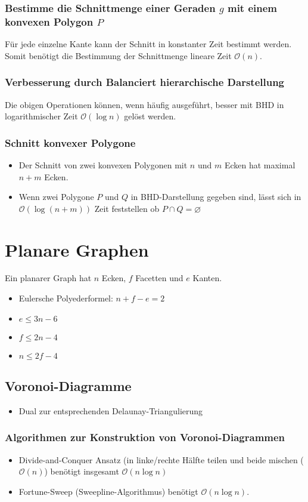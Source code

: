\documentclass[a4paper]{article}
\begin{document}
\subsubsection*{Bestimme die Schnittmenge einer Geraden $g$ mit einem konvexen Polygon $P$}
Für jede einzelne Kante kann der Schnitt in konstanter Zeit bestimmt werden.
Somit benötigt die Bestimmung der Schnittmenge lineare Zeit $\mathcal{O}(n)$.
\subsubsection*{Verbesserung durch Balanciert hierarchische Darstellung}
Die obigen Operationen können, wenn häufig ausgeführt, besser mit BHD in logarithmischer
Zeit $\mathcal{O}(\log n)$ gelöst werden.
\subsubsection*{Schnitt konvexer Polygone}
\begin{itemize}
	\item Der Schnitt von zwei konvexen Polygonen mit $n$ und $m$ Ecken hat maximal $n + m$ Ecken.
	\item Wenn zwei Polygone $P$ und $Q$ in BHD-Darstellung gegeben sind, lässt sich in 
	$\mathcal{O}(\log( n + m ))$ Zeit feststellen ob $P \cap Q = \varnothing$
\end{itemize}
\section*{Planare Graphen}
Ein planarer Graph hat $n$ Ecken, $f$ Facetten und $e$ Kanten.
\begin{itemize}
	\item Eulersche Polyederformel: $n + f - e = 2$
	\item $e \leq 3n - 6$
	\item $f \leq 2n -4$
	\item $n \leq 2f -4$
\end{itemize}

\subsection*{Voronoi-Diagramme}
\begin{itemize}
	\item Dual zur entsprechenden Delaunay-Triangulierung
\end{itemize}

\subsubsection*{Algorithmen zur Konstruktion von Voronoi-Diagrammen}
\begin{itemize}
	\item Divide-and-Conquer Ansatz (in linke/rechte Hälfte teilen und beide mischen ($\mathcal{O}(n)$) 
	benötigt insgesamt $\mathcal{O}(n \log n)$
	\item Fortune-Sweep (Sweepline-Algorithmus) benötigt $\mathcal{O}(n \log n)$.
\end{itemize}
\end{document}
